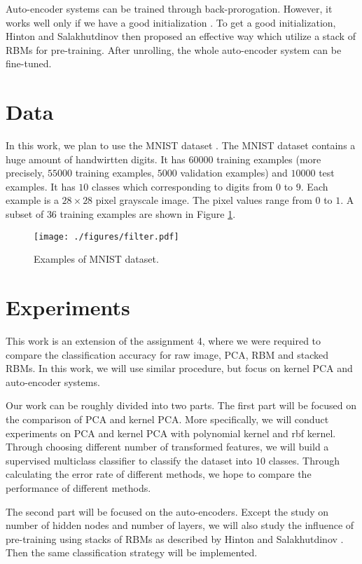 \documentclass{article}
\begin{document}
Auto-encoder systems can be trained through back-prorogation. However, it works well only if we have a good initialization \cite{hinton2006reducing}. To get a good initialization, Hinton and Salakhutdinov \cite{hinton2006reducing} then proposed an effective way which utilize a stack of RBMs for pre-training. After unrolling, the whole auto-encoder system can be fine-tuned.

\section{Data}
\label{sec:data}

In this work, we plan to use the MNIST dataset \cite{lecun1998gradient}. The MNIST dataset contains a huge amount of handwirtten digits. It has $60000$ training examples (more precisely, $55000$ training examples, $5000$ validation examples) and $10000$ test examples. It has $10$ classes which corresponding to digits from $0$ to $9$. Each example is a $28 \times 28$ pixel grayscale image. The pixel values range from $0$ to $1$. A subset of $36$ training examples are shown in Figure \ref{fig:filter}.

\begin{figure}[htb]
\centering
\texttt{[image: ./figures/filter.pdf]}
\caption{Examples of MNIST dataset.}
\label{fig:filter}
\end{figure}

\section{Experiments}
\label{sec:experiment}

This work is an extension of the assignment 4, where we were required to compare the classification accuracy for raw image, PCA, RBM and stacked RBMs. In this work, we will use similar procedure, but focus on kernel PCA and auto-encoder systems.

Our work can be roughly divided into two parts. The first part will be focused on the comparison of PCA and kernel PCA. More specifically, we will conduct experiments on PCA and kernel PCA with polynomial kernel and rbf kernel. Through choosing different number of transformed features, we will build a supervised multiclass classifier to classify the dataset into $10$ classes. Through calculating the error rate of different methods, we hope to compare the performance of different methods.

The second part will be focused on the auto-encoders. Except the study on number of hidden nodes and number of layers, we will also study the influence of pre-training using stacks of RBMs as described by Hinton and Salakhutdinov \cite{hinton2006reducing}. Then the same classification strategy will be implemented.
\end{document}
